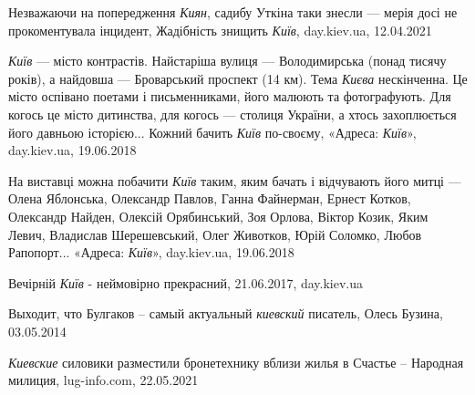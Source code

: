 Незважаючи на попередження \emph{Киян}, садибу Уткіна таки знесли — мерія досі не
прокоментувала інцидент, Жадібність знищить \emph{Київ}, day.kiev.ua, 12.04.2021

\emph{Київ} — місто контрастів. Найстаріша вулиця — Володимирська (понад тисячу
років), а найдовша — Броварський проспект (14 км). Тема \emph{Києва} нескінченна. Це
місто оспівано поетами і письменниками, його малюють та фотографують. Для
когось це місто дитинства, для когось — столиця України, а хтось захоплюється
його давньою історією...  Кожний бачить \emph{Київ} по-своєму, 
«Адреса: \emph{Київ}», day.kiev.ua, 19.06.2018

На виставці можна побачити \emph{Київ} таким, яким бачать і відчувають його митці —
Олена Яблонська, Олександр Павлов, Ганна Файнерман, Ернест Котков, Олександр
Найден, Олексій Орябинський, Зоя Орлова, Віктор Козик, Яким Левич, Владислав
Шерешевський, Олег Животков, Юрій Соломко, Любов Рапопорт...
«Адреса: \emph{Київ}», day.kiev.ua, 19.06.2018

Вечірній \emph{Київ} - неймовірно прекрасний, 21.06.2017, day.kiev.ua

Выходит, что Булгаков – самый актуальный \emph{киевский} писатель, Олесь Бузина, 03.05.2014

\emph{Киевские} силовики разместили бронетехнику вблизи жилья в Счастье – Народная
милиция, lug-info.com, 22.05.2021

